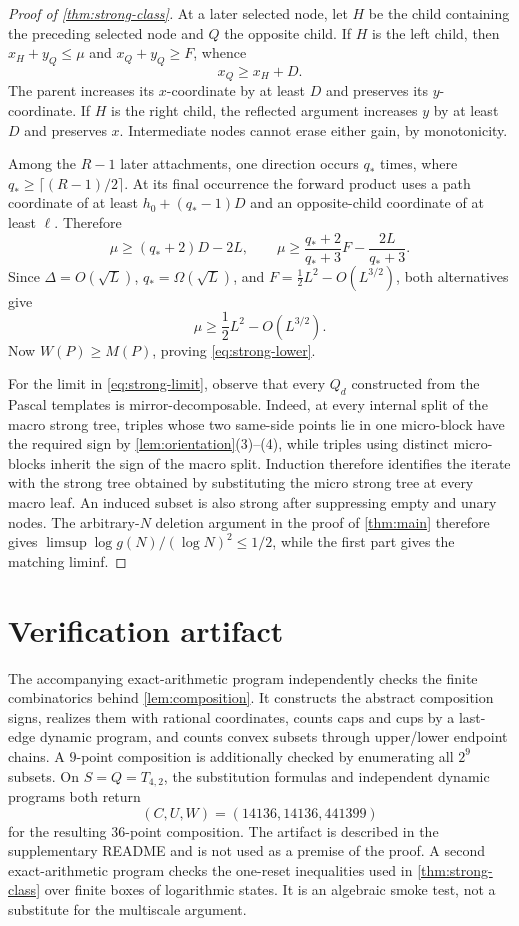 \documentclass[11pt]{article}
\theoremstyle{remark}
\begin{document}
\begin{proof}[Proof of \cref{thm:strong-class}]
At a later selected node, let $H$ be the child containing the preceding
selected node and $Q$ the opposite child.  If $H$ is the left child, then
$x_H+y_Q\le\mu$ and $x_Q+y_Q\ge F$, whence
\[
 x_Q\ge x_H+D.
\]
The parent increases its $x$-coordinate by at least $D$ and preserves its
$y$-coordinate.  If $H$ is the right child, the reflected argument
increases $y$ by at least $D$ and preserves $x$.  Intermediate nodes cannot
erase either gain, by monotonicity.

Among the $R-1$ later attachments, one direction occurs $q_*$ times, where
$q_*\ge\lceil(R-1)/2\rceil$.  At its final occurrence the forward product
uses a path coordinate of at least $h_0+(q_*-1)D$ and an opposite-child
coordinate of at least $\ell$.  Therefore
\[
 \mu\ge(q_*+2)D-2L,
 \qquad
 \mu\ge\frac{q_*+2}{q_*+3}F-\frac{2L}{q_*+3}.
\]
Since $\Delta=O(\sqrt L)$, $q_*=\Omega(\sqrt L)$, and
$F=\frac12L^2-O(L^{3/2})$, both alternatives give
\[
 \mu\ge\frac12L^2-O(L^{3/2}).
\]
Now $W(P)\ge M(P)$, proving \eqref{eq:strong-lower}.

For the limit in \eqref{eq:strong-limit}, observe that every $Q_d$
constructed from the Pascal templates is mirror-decomposable.  Indeed,
at every internal split of the macro strong tree, triples whose two
same-side points lie in one micro-block have the required sign by
\cref{lem:orientation}(3)--(4), while triples using distinct micro-blocks
inherit the sign of the macro split.  Induction therefore identifies the
iterate with the strong tree obtained by substituting the micro strong tree
at every macro leaf.  An induced subset is also strong after suppressing
empty and unary nodes.  The arbitrary-$N$ deletion argument in the proof of
\cref{thm:main} therefore gives
$\limsup\log g(N)/(\log N)^2\le1/2$, while the first part gives the
matching liminf.
\end{proof}

\section{Verification artifact}

The accompanying exact-arithmetic program independently checks the finite
combinatorics behind \cref{lem:composition}.  It constructs the abstract
composition signs, realizes them with rational coordinates, counts caps and
cups by a last-edge dynamic program, and counts convex subsets through
upper/lower endpoint chains.  A $9$-point composition is additionally
checked by enumerating all $2^9$ subsets.  On
$S=Q=T_{4,2}$, the substitution formulas and independent dynamic programs
both return
\[
 (C,U,W)=(14136,14136,441399)
\]
for the resulting $36$-point composition.  The artifact is described in
the supplementary README and is not used as a premise of the proof.  A
second exact-arithmetic program checks the one-reset inequalities used in
\cref{thm:strong-class} over finite boxes of logarithmic states.  It is an
algebraic smoke test, not a substitute for the multiscale argument.
\end{document}
